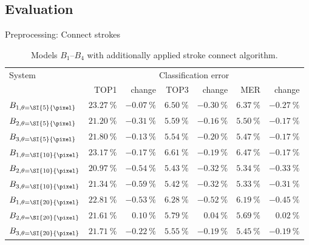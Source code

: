 \subsection{Evaluation}
\begin{frame}{Preprocessing: Connect strokes}
\begin{table}[h]
    \centering
    \begin{tabular}{lrrrrrr}
    \toprule
    \multirow{2}{*}{System} & \multicolumn{6}{c}{Classification error}\\
    \cmidrule(l){2-7}
                                         & TOP1                   & change                 & TOP3                   & change                 & MER                & change \\\midrule
    $B_{1,\theta = \SI{5}{\pixel}}$ & $\SI{23.27}{\percent}$ & $\SI{-0.07}{\percent}$ &  $\SI{6.50}{\percent}$ & $\SI{-0.30}{\percent}$ & $\SI{6.37}{\percent}$ & $\SI{-0.27}{\percent}$ \\
    $B_{2,\theta = \SI{5}{\pixel}}$ & $\SI{21.20}{\percent}$ & $\SI{-0.31}{\percent}$ &  $\SI{5.59}{\percent}$ & $\SI{-0.16}{\percent}$ & $\SI{5.50}{\percent}$ & $\SI{-0.17}{\percent}$ \\
    $B_{3,\theta = \SI{5}{\pixel}}$ & $\SI{21.80}{\percent}$ & $\SI{-0.13}{\percent}$ &  $\SI{5.54}{\percent}$ & $\SI{-0.20}{\percent}$ & $\SI{5.47}{\percent}$ & $\SI{-0.17}{\percent}$ \\\midrule
    $B_{1,\theta = \SI{10}{\pixel}}$& $\SI{23.17}{\percent}$ & $\SI{-0.17}{\percent}$ &  $\SI{6.61}{\percent}$ & $\SI{-0.19}{\percent}$ & $\SI{6.47}{\percent}$ & $\SI{-0.17}{\percent}$ \\
    $B_{2,\theta = \SI{10}{\pixel}}$& \underline{$\SI{20.97}{\percent}$} & $\SI{-0.54}{\percent}$ &  $\SI{5.43}{\percent}$ & $\SI{-0.32}{\percent}$ & $\SI{5.34}{\percent}$ & $\SI{-0.33}{\percent}$ \\
    $B_{3,\theta = \SI{10}{\pixel}}$& $\SI{21.34}{\percent}$ & $\SI{-0.59}{\percent}$ & \underline{$\SI{5.42}{\percent}$} & $\SI{-0.32}{\percent}$ & \underline{$\SI{5.33}{\percent}$} & $\SI{-0.31}{\percent}$ \\\midrule
    $B_{1,\theta = \SI{20}{\pixel}}$& $\SI{22.81}{\percent}$ & $\SI{-0.53}{\percent}$ &  $\SI{6.28}{\percent}$ & $\SI{-0.52}{\percent}$ & $\SI{6.19}{\percent}$ & $\SI{-0.45}{\percent}$ \\
    $B_{2,\theta = \SI{20}{\pixel}}$& $\SI{21.61}{\percent}$ & $\SI{+0.10}{\percent}$ &  $\SI{5.79}{\percent}$ & $\SI{+0.04}{\percent}$ & $\SI{5.69}{\percent}$ & $\SI{+0.02}{\percent}$ \\
    $B_{3,\theta = \SI{20}{\pixel}}$& $\SI{21.71}{\percent}$ & $\SI{-0.22}{\percent}$ &  $\SI{5.55}{\percent}$ & $\SI{-0.19}{\percent}$ & $\SI{5.45}{\percent}$ & $\SI{-0.19}{\percent}$ \\
    \bottomrule
    \end{tabular}
    \caption{Models $B_1$--$B_4$ with additionally applied stroke
             connect algorithm.}
\label{table:stroke-connect-evaluation}
\end{table}
\end{frame}

